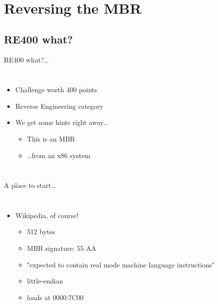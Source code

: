 
\section{Reversing the MBR}

\subsection{RE400 what?}

\begin{frame}{RE400 what?\ldots}
    \begin{columns}
	        \begin{itemize}
                \item Challenge worth 400 points
                \item Reverse Engineering category
                \item We get some hints right away\ldots
                \begin{itemize}
                	\item This is an MBR
                	\item \ldots from an x86 system
        	    \end{itemize}
            \end{itemize}
    \end{columns}
\end{frame}

\begin{frame}{A place to start\ldots}
    \begin{columns}
	        \begin{itemize}
                \item<1-> Wikipedia, of course!
		        \begin{itemize}
    	            \item<2-> 512 bytes
        	        \item<2-> MBR signature: 55 AA
            	    \item<2-> "expected to contain real mode machine language instructions"
                	\item<2-> little-endian
                	\item<2-> loads at 0000:7C00
	            \end{itemize}
            \end{itemize}
    \end{columns}
\end{frame}

